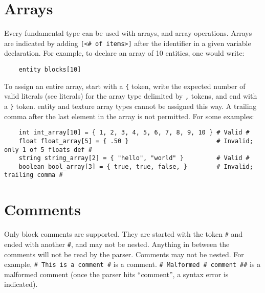\documentclass[titlepage]{article}
\begin{document}
\section{Arrays}
Every fundamental type can be used with arrays, and array operations. Arrays are indicated by adding \verb|[<# of items>]| after the identifier in a given variable declaration. For example, to declare an array of 10 entities, one would write:
\begin{verbatim}
	entity blocks[10]
\end{verbatim}
To assign an entire array, start with a \verb|{| token, write the expected number of valid literals (see literals) for the array type delimited by \verb|,| tokens, and end with a \verb|}| token. entity and texture array types cannot be assigned this way. A trailing comma after the last element in the array is not permitted. For some examples:

\begin{verbatim}
	int int_array[10] = { 1, 2, 3, 4, 5, 6, 7, 8, 9, 10 } # Valid #
	float float_array[5] = { .50 }                        # Invalid; only 1 of 5 floats def #
	string string_array[2] = { "hello", "world" }         # Valid #
	boolean bool_array[3] = { true, true, false, }        # Invalid; trailing comma #
\end{verbatim}

\section{Comments}
Only block comments are supported. They are started with the token \verb|#| and ended with another \verb|#|, and may not be nested. Anything in between the comments will not be read by the parser. Comments may not be nested. For example, \verb|# This is a comment #| is a comment. \verb|# Malformed # comment ##| is a malformed comment (once the parser hits “comment”, a syntax error is indicated).
\end{document}
